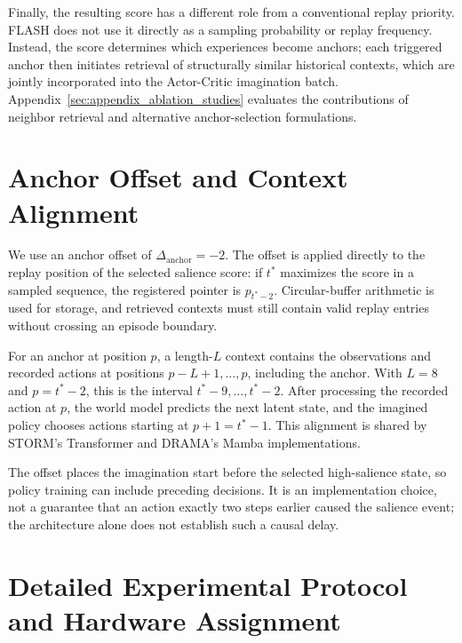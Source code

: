 \documentclass{article} %
\begin{document}
Finally, the resulting score has a different role from a conventional replay priority. FLASH does not use it directly as a sampling probability or replay frequency. Instead, the score determines which experiences become anchors; each triggered anchor then initiates retrieval of structurally similar historical contexts, which are jointly incorporated into the Actor-Critic imagination batch. Appendix~\ref{sec:appendix_ablation_studies} evaluates the contributions of neighbor retrieval and alternative anchor-selection formulations.

\FloatBarrier

\onecolumn

\section{Anchor Offset and Context Alignment}
\label{sec:appendix_causal_anchor}

We use an anchor offset of $\Delta_{\text{anchor}}=-2$. The offset is applied directly to the replay position of the selected salience score: if $t^*$ maximizes the score in a sampled sequence, the registered pointer is $p_{t^*-2}$. Circular-buffer arithmetic is used for storage, and retrieved contexts must still contain valid replay entries without crossing an episode boundary.

For an anchor at position $p$, a length-$L$ context contains the observations and recorded actions at positions $p-L+1,\ldots,p$, including the anchor. With $L=8$ and $p=t^*-2$, this is the interval $t^*-9,\ldots,t^*-2$. After processing the recorded action at $p$, the world model predicts the next latent state, and the imagined policy chooses actions starting at $p+1=t^*-1$. This alignment is shared by STORM's Transformer and DRAMA's Mamba implementations.

The offset places the imagination start before the selected high-salience state, so policy training can include preceding decisions. It is an implementation choice, not a guarantee that an action exactly two steps earlier caused the salience event; the architecture alone does not establish such a causal delay.

\onecolumn

\section{Detailed Experimental Protocol and Hardware Assignment}
\label{app:experimental_protocol}
\end{document}
